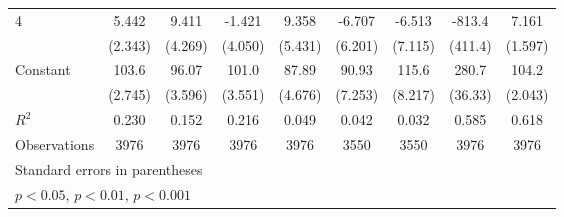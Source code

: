\documentclass{article}
\begin{document}
{\begin{longtable}{l*{8}{c}}
4               &    5.442\sym{*}  &    9.411\sym{*}  &   -1.421         &    9.358         &   -6.707         &   -6.513         &   -813.4         &    7.161\sym{***}\\
                &  (2.343)         &  (4.269)         &  (4.050)         &  (5.431)         &  (6.201)         &  (7.115)         &  (411.4)         &  (1.597)         \\
Constant        &    103.6\sym{***}&    96.07\sym{***}&    101.0\sym{***}&    87.89\sym{***}&    90.93\sym{***}&    115.6\sym{***}&    280.7\sym{***}&    104.2\sym{***}\\
                &  (2.745)         &  (3.596)         &  (3.551)         &  (4.676)         &  (7.253)         &  (8.217)         &  (36.33)         &  (2.043)         \\
\hline
\(R^{2}\)       &    0.230         &    0.152         &    0.216         &    0.049         &    0.042         &    0.032         &    0.585         &    0.618         \\
Observations    &     3976         &     3976         &     3976         &     3976         &     3550         &     3550         &     3976         &     3976         \\
\hline\hline
\multicolumn{9}{l}{\footnotesize Standard errors in parentheses}\\
\multicolumn{9}{l}{\footnotesize \sym{*} \(p<0.05\), \sym{**} \(p<0.01\), \sym{***} \(p<0.001\)}\\
\end{longtable}
}
\end{document}
